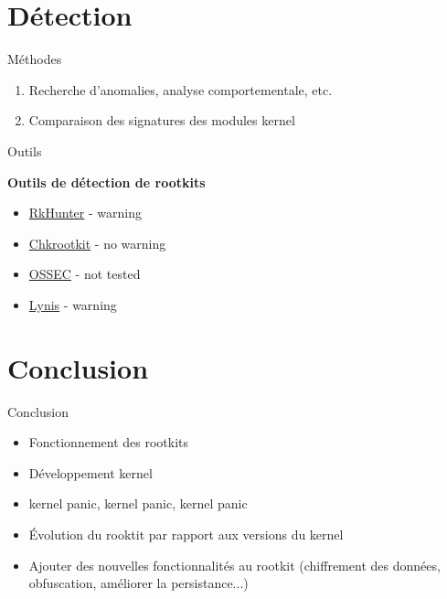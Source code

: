 \documentclass[10pt]{beamer}
\begin{document}
\section{Détection}

\begin{frame}{Méthodes}
	
	\begin{alertblock}{}
		\begin{enumerate}
			\item Recherche d'anomalies, analyse comportementale, etc.
			\item Comparaison des signatures des modules kernel
		\end{enumerate}
    \end{alertblock}
	

\end{frame}

\begin{frame}{Outils}
	
	\textbf{Outils de détection de rootkits}
	\begin{itemize}
		\item \href{http://rkhunter.sourceforge.net/}{RkHunter} - \alert{warning}
		\item \href{http://www.chkrootkit.org/}{Chkrootkit} - {\color[rgb]{0,0.8,0.3} no warning}
		\item \href{http://ossec.github.io/}{OSSEC}   - {\color{gray} not tested}
		\item \href{https://cisofy.com/lynis/}{Lynis} - \alert{warning}
	\end{itemize}
	
\end{frame}


\section*{Conclusion}

\begin{frame}{Conclusion}
	
	\begin{alertblock}{}
	\begin{itemize}
		\item Fonctionnement des rootkits
		\item Développement kernel
		\item kernel panic, kernel panic, kernel panic
		\item Évolution du rooktit par rapport aux versions du kernel
		\item Ajouter des nouvelles fonctionnalités au rootkit (chiffrement des données, obfuscation, améliorer la persistance...)
		
	\end{itemize}
    \end{alertblock}

\end{frame}
\end{document}
